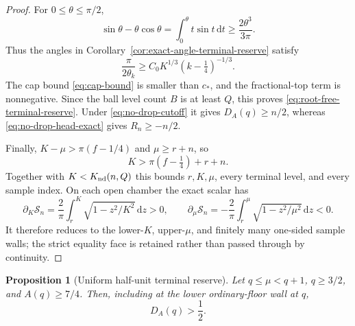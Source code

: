 \documentclass[11pt]{article}
\newtheorem{proposition}[theorem]{Proposition}
\theoremstyle{remark}
\newcommand{\dd}{\,\mathrm d}
\begin{document}
\begin{proof}
For $0\leq\theta\leq\pi/2$,
\[
 \sin\theta-\theta\cos\theta
 =\int_0^\theta t\sin t\dd t\geq\frac{2\theta^3}{3\pi}.
\]
Thus the angles in Corollary~\ref{cor:exact-angle-terminal-reserve} satisfy
\[
 \frac\pi{2\theta_k}\geq
 C_0K^{1/3}(k-\tfrac14)^{-1/3}.
\]
The cap bound \eqref{eq:cap-bound} is smaller than $c_*$, and the
fractional-top term is nonnegative.  Since the ball level count $B$ is at
least $Q$, this proves \eqref{eq:root-free-terminal-reserve}.  Under
\eqref{eq:no-drop-cutoff} it gives $D_A(q)\geq n/2$, whereas
\eqref{eq:no-drop-head-exact} gives $R_n\geq-n/2$.

Finally, $K-\mu>\pi(f-1/4)$ and $\mu\geq r+n$, so
\[
 K>\pi(f-\tfrac14)+r+n.
\]
Together with $K<K_{\rm nd}(n,Q)$ this bounds $r,K,\mu$, every terminal
level, and every sample index.  On each open chamber the exact scalar has
\[
 \partial_K\mathcal S_n=\frac2\pi\int_r^K
 \sqrt{1-z^2/K^2}\dd z>0,\qquad
 \partial_\mu\mathcal S_n=-\frac2\pi\int_r^\mu
 \sqrt{1-z^2/\mu^2}\dd z<0.
\]
It therefore reduces to the lower-$K$, upper-$\mu$, and finitely many
one-sided sample walls; the strict equality face is retained rather than
passed through by continuity.
\end{proof}

\begin{proposition}[Uniform half-unit terminal reserve]
\label{prop:no-drop-half-unit}
Let $q\leq\mu<q+1$, $q\geq3/2$, and $A(q)\geq7/4$.  Then, including at
the lower ordinary-floor wall at $q$,
\begin{equation}
 \boxed{D_A(q)>\frac12.}
 \label{eq:no-drop-half-unit}
\end{equation}
\end{proposition}
\end{document}
